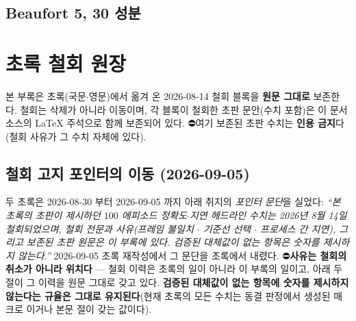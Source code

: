 \documentclass[11pt]{report}
\numberwithin{equation}{chapter}
\numberwithin{figure}{chapter}
\numberwithin{table}{chapter}
\begin{document}
\section{Beaufort 5, 30 성분}


\chapter{초록 철회 원장}
\label{app:abstract_ledger}

본 부록은 초록(국문$\cdot$영문)에서 옮겨 온 2026-08-14 철회 블록을 \textbf{원문 그대로}
보존한다. 철회는 삭제가 아니라 이동이며, 각 블록이 철회한 초판 문안(수치 포함)은 이 문서
소스의 LaTeX 주석으로 함께 보존되어 있다. ⛔여기 보존된 초판 수치는 \textbf{인용
금지}다(철회 사유가 그 수치 자체에 있다).

\section{철회 고지 포인터의 이동 (2026-09-05)}

두 초록은 2026-08-30 부터 2026-09-05 까지 아래 취지의 \emph{포인터 문단}을 실었다:
\emph{``본 초록의 초판이 제시하던 $100$ 에피소드 정확도$\cdot$지연 헤드라인 수치는
2026년 8월 14일 철회되었으며, 철회 전문과 사유(프레임 불일치 $\cdot$ 기준선 선택 $\cdot$
프로세스 간 지연), 그리고 보존된 초판 원문은 이 부록에 있다. 검증된 대체값이 없는
항목은 숫자를 제시하지 않는다.''}
2026-09-05 초록 재작성에서 그 문단을 초록에서 내렸다. ⛔\textbf{사유는 철회의 취소가
아니라 위치다} --- 철회 이력은 초록의 일이 아니라 이 부록의 일이고, 아래 두 절이 그
이력을 원문 그대로 갖고 있다. \textbf{검증된 대체값이 없는 항목에 숫자를 제시하지
않는다는 규율은 그대로 유지된다}(현재 초록의 모든 수치는 동결 판정에서 생성된 매크로
이거나 본문 절이 갖는 값이다).
\end{document}

